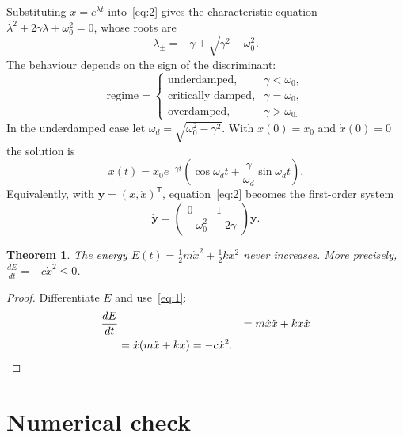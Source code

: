 \documentclass[11pt,a4paper]{article}
\newtheorem{theorem}{Theorem}
\begin{document}
Substituting $x=e^{\lambda t}$ into~\eqref{eq:2} gives the characteristic equation $\lambda^{2}+2\gamma\lambda+\omega_{0}^{2}=0$, whose roots are
\begin{equation}
  \lambda_{\pm}=-\gamma\pm\sqrt{\gamma^{2}-\omega_{0}^{2}}.
  \label{eq:main}
\end{equation}
The behaviour depends on the sign of the discriminant:
\begin{equation*}
  \text{regime}=\begin{cases}
\text{underdamped,} & \gamma<\omega_{0}, \\
\text{critically damped,} & \gamma=\omega_{0}, \\
\text{overdamped,} & \gamma>\omega_{0.}
\end{cases}
\end{equation*}
In the underdamped case let $\omega_{d}=\sqrt{\omega_{0}^{2}-\gamma^{2}}$. With $x(0)=x_{0}$ and $\dot{x}(0)=0$ the solution is
\begin{equation}
  x(t)=x_{0}e^{-\gamma t}\left( \cos\omega_{d}t+\frac{\gamma}{\omega_{d}}\sin\omega_{d}t \right).
  \label{eq:cos-dsin}
\end{equation}
Equivalently, with $\mathbf{y}=(x,\dot{x})^{\mathsf T}$, equation~\eqref{eq:2} becomes the first-order system
\begin{equation}
  \dot{\mathbf{y}}=\begin{pmatrix}
0 & 1 \\
-\omega_{0}^{2} & -2\gamma
\end{pmatrix}\mathbf{y}.
\end{equation}

\begin{theorem}
  The energy $E(t)=\frac{1}{2}m\dot{x}^{2}+\frac{1}{2}kx^{2}$ never increases. More precisely, $\frac{dE}{dt}=-c\dot{x}^{2}\leq0$.
\end{theorem}

\begin{proof}
  Differentiate $E$ and use~\eqref{eq:1}:
\begin{align*}
  \frac{dE}{dt}& &=m\dot{x}\ddot{x}+kx\dot{x} \\
   &=\dot{x}(m\ddot{x}+kx)=-c\dot{x}^{2}. \qedhere
\end{align*}
\end{proof}

\section{Numerical check}\label{sec:results}
\end{document}
